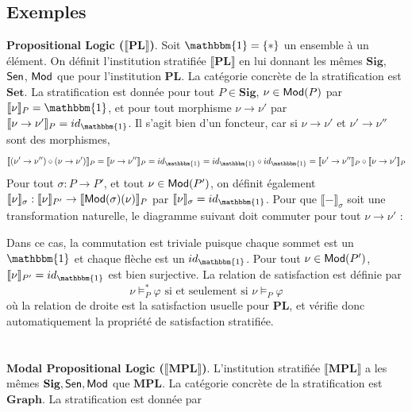 \documentclass[11pt,a4paper]{report}
\newcommand{\ph}{\varphi}
\newcommand{\gr}{\textbf}
\newcommand{\lb}{\llbracket}
\newcommand{\rb}{\rrbracket}
\newcommand{\info}[1]{\text{{\fontfamily{lmss}\selectfont #1}}}
\newcommand{\Mod}{\info{Mod}}
\newcommand{\Sen}{\info{Sen}}
\newcommand{\1}{\mathbbm{1}}
\begin{document}
\subsection{Exemples}
\gr{Propositional Logic ($\lb \gr{PL} \rb$)}.  Soit $\1 = \{*\}$ un ensemble à un élément. On définit l'institution stratifiée $\lb \gr{PL} \rb$ en lui donnant les mêmes $\gr{Sig}$, $\Sen$, $\Mod$ que pour l'institution $\gr{PL}$. La catégorie concrète de la stratification est $\gr{Set}$. La stratification est donnée pour tout $P \in \gr{Sig}$, $\nu \in \Mod(P)$ par $\lb \nu \rb_P = \1$, et pour tout morphisme $\nu \to \nu'$ par $\lb \nu \to \nu' \rb_P = id_\1$. Il s'agit bien d'un foncteur, car si $\nu \to \nu'$ et $\nu' \to \nu''$ sont des morphismes, 
\[ \lb (\nu' \to \nu'') \circ (\nu \to \nu') \rb_P = \lb \nu \to \nu'' \rb_P = id_\1 = id_\1 \circ id_\1 = \lb \nu' \to \nu'' \rb_P \circ \lb \nu \to \nu' \rb_P \]
Pour tout $\sigma : P \to P'$, et tout $\nu \in \Mod(P')$, on définit également $\lb \nu \rb_\sigma : \lb \nu \rb_{P'} \to \lb \Mod(\sigma)(\nu) \rb_P$ par $\lb \nu \rb_\sigma =id_\1$. Pour que $\lb - \rb_\sigma$ soit une transformation naturelle, le diagramme suivant doit commuter pour tout $\nu \to \nu'$ :
\begin{center}
\end{center}
Dans ce cas, la commutation est triviale puisque chaque sommet est un $\1$ et chaque flèche est un $id_\1$. Pour tout $\nu \in \Mod(P')$, $\lb \nu \rb_{P'} = id_\1$ est bien surjective. La relation de satisfaction est définie par 
\[ \nu \models_P^* \ph \text{ si et seulement si } \nu \models_P \ph \]
où la relation de droite est la satisfaction usuelle pour $\gr{PL}$, et vérifie donc automatiquement la propriété de satisfaction stratifiée.\\\\\\
\gr{Modal Propositional Logic ($\lb \gr{MPL} \rb$)}. L'institution stratifiée $\lb \gr{MPL} \rb$ a les mêmes $\gr{Sig}, \Sen, \Mod$ que $\gr{MPL}$. La catégorie concrète de la stratification est $\gr{Graph}$. La stratification est donnée par
\end{document}
